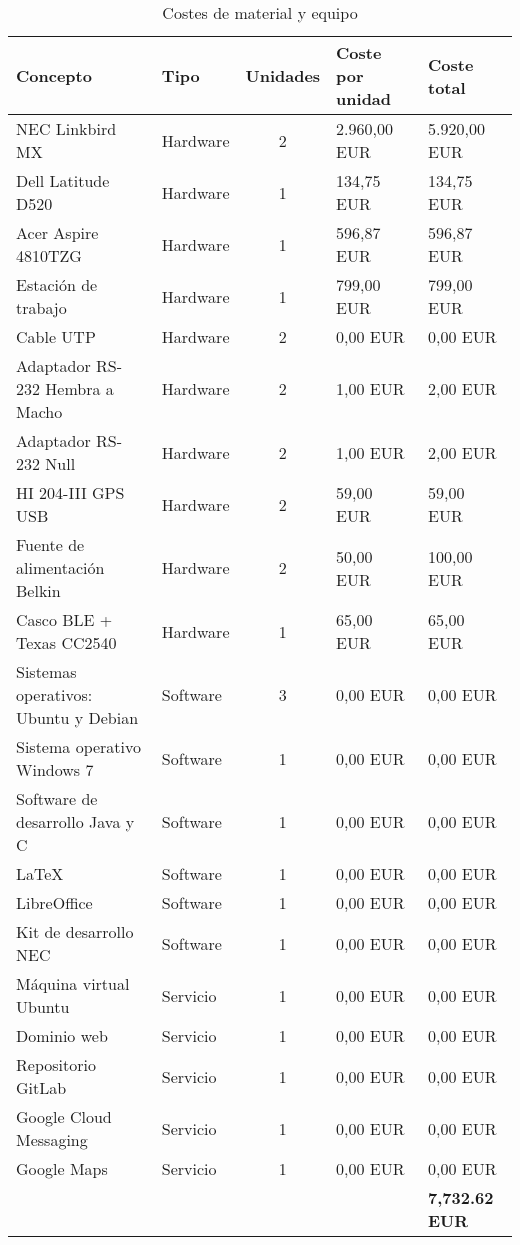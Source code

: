 \begin{table}
	\centering
	\caption{Costes de material y equipo}\label{tab:presupuestoMaterial}
	\begin{tabular}{llcll}
		\toprule
		\textbf{Concepto} & \textbf{Tipo} & \textbf{Unidades} & \textbf{Coste por unidad} & \textbf{Coste total} \\
		\midrule
		NEC Linkbird MX & Hardware & 2 & 2.960,00 EUR & 5.920,00 EUR \\
		Dell Latitude D520 & Hardware & 1 & 134,75 EUR & 134,75 EUR \\
		Acer Aspire 4810TZG & Hardware & 1 & 596,87 EUR & 596,87 EUR \\
		Estación de trabajo & Hardware & 1 & 799,00 EUR & 799,00 EUR \\
		Cable UTP & Hardware & 2 & 0,00 EUR & 0,00 EUR \\
		Adaptador RS-232 Hembra a Macho & Hardware & 2 & 1,00 EUR & 2,00 EUR \\
		Adaptador RS-232 Null & Hardware & 2 & 1,00 EUR & 2,00 EUR \\
		HI 204-III GPS USB & Hardware & 2 & 59,00 EUR & 59,00 EUR \\
		Fuente de alimentación Belkin & Hardware & 2 & 50,00 EUR & 100,00 EUR \\
		Casco BLE + Texas CC2540 & Hardware & 1 & 65,00 EUR & 65,00 EUR \\
		Sistemas operativos: Ubuntu y Debian & Software & 3 & 0,00 EUR & 0,00 EUR \\
		Sistema operativo Windows 7 & Software & 1 & 0,00 EUR & 0,00 EUR \\
		Software de desarrollo Java y C & Software & 1 & 0,00 EUR & 0,00 EUR \\
		LaTeX & Software & 1 & 0,00 EUR & 0,00 EUR \\
		LibreOffice & Software & 1 & 0,00 EUR & 0,00 EUR \\
		Kit de desarrollo NEC & Software & 1 & 0,00 EUR & 0,00 EUR \\
		Máquina virtual Ubuntu & Servicio & 1 & 0,00 EUR & 0,00 EUR \\
		Dominio web & Servicio & 1 & 0,00 EUR & 0,00 EUR \\
		Repositorio GitLab & Servicio & 1 & 0,00 EUR & 0,00 EUR \\
		Google Cloud Messaging & Servicio & 1 & 0,00 EUR & 0,00 EUR \\
		Google Maps & Servicio & 1 & 0,00 EUR & 0,00 EUR \\
		& & & & \textbf{7,732.62 EUR}\\
		\bottomrule
	\end{tabular}
\end{table}
